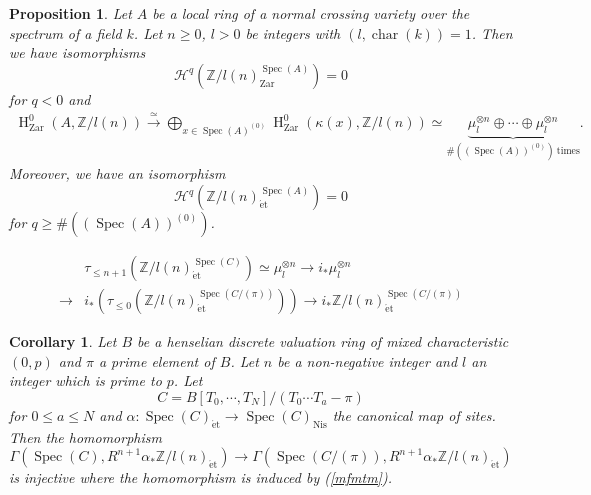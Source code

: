 \documentclass[10pt,a4paper]{amsart}
\newtheorem{prop}{Proposition}
\newtheorem{cor}{Corollary}
\newcommand{\HO}{\operatorname{H}}
\newcommand{\Nis}{\mathrm{Nis}}
\newcommand{\Zar}{\mathrm{Zar}}
\newcommand{\et}{\mathrm{\acute{e}t}}
\newcommand{\spec}{\operatorname{Spec}}
\begin{document}
\begin{prop}\upshape\label{constm}
Let $A$ be a local ring of a normal crossing variety over the spectrum of  
a field $k$. Let $n\geq 0$, $l>0$ be integers with $(l, \operatorname{char}(k))=1$.
Then we have isomorphisms
%
\begin{equation}\label{Vanineg}
\mathcal{H}^{q}(\mathbb{Z}/l(n)_{\Zar}^{\spec(A)})=0    
\end{equation}
%
for $q<0$ and
%
\begin{align}\label{Zerods}
\HO^{0}_{\Zar}(
A, 
\mathbb{Z}/l(n)
)  
\xrightarrow{\simeq}
\bigoplus_{x\in\spec(A)^{(0)}}
\HO^{0}_{\Zar}(
\kappa(x),
\mathbb{Z}/l(n)
)
\simeq
\underbrace{
\mu_{l}^{\otimes n}
\oplus\cdots
\oplus
\mu_{l}^{\otimes n}
}_{\#\left((\spec(A))^{(0)}\right) ~ \textrm{times}}.
\end{align}
%
Moreover, we have an isomorphism
%
\begin{equation}\label{Vanipos}
\mathcal{H}^{q}(
\mathbb{Z}/l(n)_{\et}^{\spec(A)}
)    
=0
\end{equation}
%
for $q\geq\#\left((\spec(A))^{(0)}\right)$.
\end{prop}

\begin{align}\label{mfmtm}
&\tau_{\leq n+1}(
\mathbb{Z}/l(n)_{\et}^{\spec(C)}
)    
\simeq 
\mu_{l}^{\otimes n}
\to
i_{*}\mu_{l}^{\otimes n}  \nonumber 
\\
\to
&i_{*}\left(
\tau_{\leq 0}(\mathbb{Z}/l(n)_{\et}^{\spec(C/(\pi))}
)
\right)
\to 
i_{*}\mathbb{Z}/l(n)_{\et}^{\spec(C/(\pi))}
\end{align}

\begin{cor}\upshape\label{inclaffmt}
Let $B$ be a henselian discrete valuation ring of mixed characteristic $(0, p)$ and
$\pi$ a prime element of $B$. Let $n$ be a non-negative integer and 
$l$ an integer which is prime to $p$.
Let 
%
\begin{equation*}
C=
B[T_{0}, \cdots, T_{N}]/
(T_{0}\cdots T_{a}-\pi)
\end{equation*}
%
for 
$0\leq a\leq N$
and
$\alpha: \spec(C)_{\et}\to \spec(C)_{\Nis}$
the canonical map of sites. Then the homomorphism
%
\begin{equation*}
\Gamma\left(
\spec(C),
R^{n+1}\alpha_{*}\mathbb{Z}/l(n)_{\et}
\right)
\to
\Gamma\left(
\spec(C/(\pi)),
R^{n+1}\alpha_{*}\mathbb{Z}/l(n)_{\et}
\right)
\end{equation*}
%
is injective where the homomorphism is induced by (\ref{mfmtm}).
\end{cor}
\end{document}
